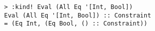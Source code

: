 \begin{repl}\begin{lstlisting}
> :kind! Eval (All Eq '[Int, Bool])
Eval (All Eq '[Int, Bool]) :: Constraint
= (Eq Int, (Eq Bool, () :: Constraint))\end{lstlisting}\end{repl}

